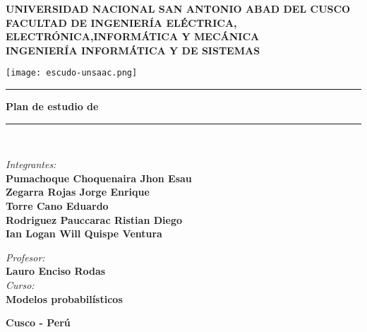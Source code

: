 \documentclass[a4paper]{article}
\begin{document}
\begin{titlepage}

\newcommand{\linea}{\rule{\linewidth}{0.7mm}} 
\center

\textbf{\Large UNIVERSIDAD NACIONAL SAN ANTONIO ABAD DEL CUSCO}\\[0.2cm]
\textbf{\Large FACULTAD DE INGENIERÍA ELÉCTRICA, ELECTRÓNICA,INFORMÁTICA Y MECÁNICA}\\[0.2cm]
\textbf{\Large INGENIERÍA INFORMÁTICA Y DE SISTEMAS\\[0.6cm]}

\texttt{[image: escudo-unsaac.png]}
\vfill

\linea
\vfill
\textbf{\LARGE Plan de estudio de }\\[0.2cm]
\linea \\
\vfill

\textit{\Large Integrantes:}\\
    \vfill
    \textbf{\large Pumachoque Choquenaira Jhon Esau}\\[0.1cm]
    \textbf{\large Zegarra Rojas Jorge Enrique}\\[0.1cm]
    \textbf{\large Torre Cano Eduardo}\\[0.1cm]
    \textbf{\large Rodriguez Pauccarac Ristian Diego}\\[0.1cm]
    \textbf{\large Ian Logan Will Quispe Ventura}\\
    \vfill

\vspace{0.3cm}
    \textit{\Large Profesor:}\\
    \textbf{Lauro Enciso Rodas}\\
\vspace{0.5cm}
    \textit{\Large Curso:}\\
    \textbf{Modelos probabilísticos}\\
    \vfill

\vspace{0.5cm}
    \textbf{\Large Cusco - Perú }\\
    \newpage
    \end{titlepage}
\end{document}
